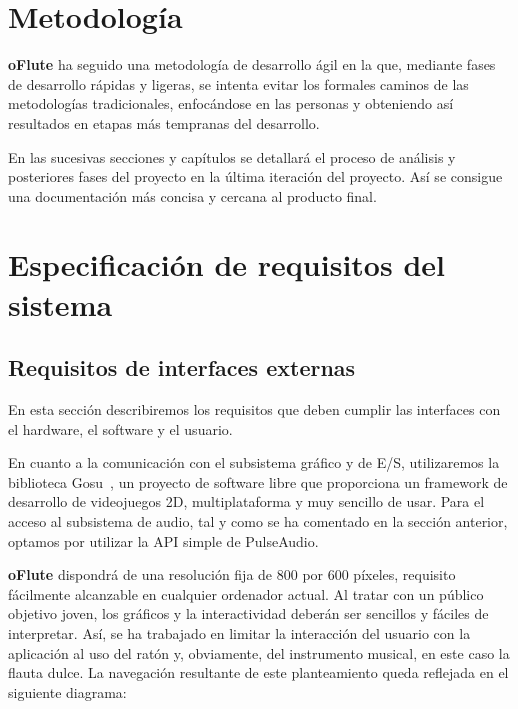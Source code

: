 
\section{Metodología}
\textbf{oFlute} ha seguido una metodología de desarrollo ágil en la que,
mediante fases de desarrollo rápidas y ligeras, se intenta evitar los formales
caminos de las metodologías tradicionales, enfocándose en las personas y
obteniendo así resultados en etapas más tempranas del desarrollo.

En las sucesivas secciones y capítulos se detallará el proceso de análisis y
posteriores fases del proyecto en la última iteración del proyecto. Así se
consigue una documentación más concisa y cercana al producto final.

\section{Especificación de requisitos del sistema}

\subsection{Requisitos de interfaces externas}
En esta sección describiremos los requisitos que deben cumplir las interfaces
con el hardware, el software y el usuario.

En cuanto a la comunicación con el subsistema gráfico y de E/S, utilizaremos la
biblioteca Gosu~\cite{gosu}, un proyecto de software libre que proporciona un
framework de desarrollo de videojuegos 2D, multiplataforma y muy sencillo de
usar. Para el acceso al subsistema de audio, tal y como se ha comentado en la
sección anterior, optamos por utilizar la API simple de PulseAudio.

\textbf{oFlute} dispondrá de una resolución fija de 800 por 600 píxeles,
requisito fácilmente alcanzable en cualquier ordenador actual. Al tratar con un
público objetivo joven, los gráficos y la interactividad deberán ser sencillos y
fáciles de interpretar. Así, se ha trabajado en limitar la interacción del
usuario con la aplicación al uso del ratón y, obviamente, del instrumento
musical, en este caso la flauta dulce. La navegación resultante de este
planteamiento queda reflejada en el siguiente diagrama:

